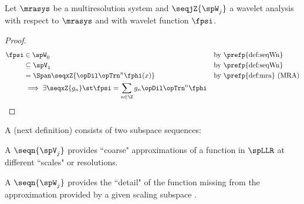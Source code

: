 \begin{theorem}
\label{thm:g->psi}
Let $\mrasys$ be a multiresolution system
and $\seqjZ{\spW_j}$ a wavelet analysis with respect to $\mrasys$ and with wavelet function $\fpsi$.
\end{theorem}
\begin{proof}
\begin{align*}
  \fpsi &\in \spW_0
        && \text{by \prefp{def:seqWn}}
      \\&\subseteq \spV_1
        && \text{by \prefp{def:seqWn}}
      \\&= \Span\seqxZ{\opDil\opTrn^n\fphi(x)}
        && \text{by \prefp{def:mra} (MRA)}
      \\&\implies 
         \exists \seqxZ{g_n} \st
            \fpsi = \sum_{n\in\Z}  g_n \opDil \opTrn^n \fphi
\end{align*}

\end{proof}

A  (next definition) consists of two subspace sequences: 
\begin{liste}
  \item A  $\seqn{\spV_j}$ 
     provides ``coarse" approximations of a function in $\spLLR$ at different ``scales" or resolutions.
  \item A  $\seqn{\spW_j}$
     provides the ``detail" of the function missing from the approximation provided by a given scaling subspace
     .
\end{liste}

